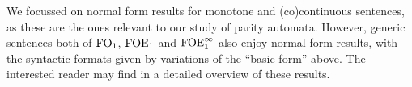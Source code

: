 \begin{remark} We focussed on normal form results for monotone and (co)continuous sentences, as these are the ones relevant to our study of parity automata. However, generic sentences both of $\mathrm{FO}_1$, $\mathrm{FOE}_1$ and $\mathrm{FOE}^{\infty}_1$ also enjoy normal form results, with the syntactic formats given by variations of the ``basic form'' above. The interested reader may find in \cite{CFVZ-ModelTheoryPaper} a detailed overview of these results.
 \end{remark}




